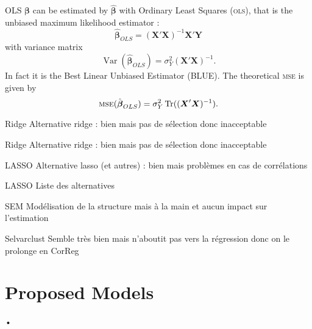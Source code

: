 \documentclass[11pt]{beamer}
\begin{document}
		\begin{frame}{OLS}
		$\boldsymbol{\beta}$ can be estimated by $\hat{\boldsymbol{\beta}}$ with Ordinary Least Squares (\textsc{ols}), that is the unbiased maximum likelihood estimator \cite{saporta2006probabilites,dodge2004analyse}: %
	\begin{equation}
		\boldsymbol{\hat{\beta}}_{OLS}=\left(\boldsymbol{X}'\boldsymbol{X} \right) ^{-1}\boldsymbol{X}'\boldsymbol{Y}\label{betaOLS}
	\end{equation}
	with variance matrix
	\begin{equation}
		\operatorname{Var}(\hat{\boldsymbol{\beta}}_{OLS})=\sigma_Y^2\left(\boldsymbol{X}'\boldsymbol{X} \right) ^{-1}. \label{eq:varOLS}
	\end{equation}
	 In fact it is the Best Linear Unbiased Estimator (BLUE).
	 The theoretical \textsc{mse} is given by
	\begin{equation}
	\textsc{mse}(\hat{\boldsymbol{\beta}}_{OLS})= \sigma_Y^2 \operatorname{Tr}((\boldsymbol{X}'\boldsymbol{X})^{-1}). \nonumber 
	\end{equation}
		\end{frame}
		
		\begin{frame}{Ridge}
		Alternative ridge : bien mais pas de sélection donc inacceptable
		\end{frame}
		
		\begin{frame}{Ridge}
		Alternative ridge : bien mais pas de sélection donc inacceptable
		\end{frame}
		
		\begin{frame}{LASSO}
		Alternative lasso (et autres) : bien mais problèmes en cas de corrélations
		\end{frame}
		\begin{frame}{LASSO}
		Liste des alternatives
		\end{frame}
		\begin{frame}{ SEM }
		 Modélisation de la structure mais à la main et aucun impact sur l'estimation
		 \end{frame}
		 
		\begin{frame}{ Selvarclust }
			Semble très bien mais n'aboutit pas vers la régression donc on le prolonge en CorReg
		\end{frame}
\section{Proposed Models}
	\begin{frame}{•}
	
	\end{frame}
\end{document}
